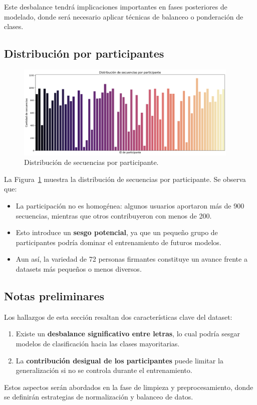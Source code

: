\documentclass[12pt]{article}
\begin{document}
Este desbalance tendrá implicaciones importantes en fases posteriores de modelado, donde será necesario aplicar técnicas de balanceo o ponderación de clases.

\subsection{Distribución por participantes}

\begin{figure}[h]
    \centering
    \includegraphics[width=0.95\textwidth]{grafico_participantes.png}
    \caption{Distribución de secuencias por participante.}
    \label{fig:participantes}
\end{figure}

La Figura~\ref{fig:participantes} muestra la distribución de secuencias por participante. Se observa que:  
\begin{itemize}
    \item La participación no es homogénea: algunos usuarios aportaron más de 900 secuencias, mientras que otros contribuyeron con menos de 200.
    \item Esto introduce un \textbf{sesgo potencial}, ya que un pequeño grupo de participantes podría dominar el entrenamiento de futuros modelos.
    \item Aun así, la variedad de 72 personas firmantes constituye un avance frente a datasets más pequeños o menos diversos.
\end{itemize}

\subsection{Notas preliminares}
Los hallazgos de esta sección resaltan dos características clave del dataset:  
\begin{enumerate}
    \item Existe un \textbf{desbalance significativo entre letras}, lo cual podría sesgar modelos de clasificación hacia las clases mayoritarias.  
    \item La \textbf{contribución desigual de los participantes} puede limitar la generalización si no se controla durante el entrenamiento.  
\end{enumerate}
Estos aspectos serán abordados en la fase de limpieza y preprocesamiento, donde se definirán estrategias de normalización y balanceo de datos.
\end{document}
